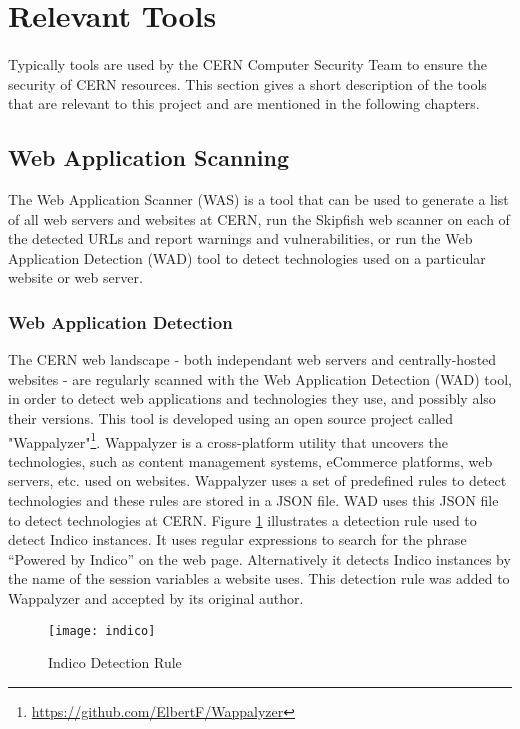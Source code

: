 \section{Relevant Tools}
\label{sec:tools}
\paragraph{}
Typically tools are used by the CERN Computer Security Team to ensure the security of CERN resources. This section gives a short description of the tools that are relevant to this project and are mentioned in the following chapters. 
\subsection{Web Application Scanning} 
The Web Application Scanner (WAS) is a tool that can be used to generate a list of all web servers and websites at CERN, run the Skipfish web scanner on each of the detected URLs and report warnings and vulnerabilities, or run the Web Application Detection (WAD) tool to detect technologies used on a particular website or web server.
\subsubsection{Web Application Detection}
The CERN web landscape - both independant web servers and centrally-hosted websites - are regularly scanned with the Web Application Detection (WAD) tool, in order to detect web applications and technologies they use, and possibly also their versions. This tool is developed using an open source project called "Wappalyzer"\footnote{\url{https://github.com/ElbertF/Wappalyzer}}. Wappalyzer is a cross-platform utility that uncovers the technologies, such as content management systems, eCommerce platforms, web servers, etc. used on websites.  Wappalyzer uses a set of predefined rules to detect technologies and these rules are stored in a JSON file. WAD uses this JSON file to detect technologies at CERN. Figure \ref{figure:indico} illustrates a detection rule used to detect Indico instances. It uses regular expressions to search for the phrase ``Powered by Indico'' on the web page. Alternatively it detects Indico instances by the name of the session variables a website uses. This detection rule was added to Wappalyzer and accepted by its original author.
\begin{figure}[h!]

  \centering
    \texttt{[image: indico]}
  \caption{Indico Detection Rule}
  \label{figure:indico}
\end{figure}
 
